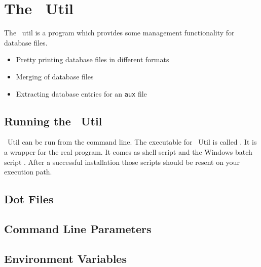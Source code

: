 

\section{The \ExBib\ Util}

The \ExBib\ util is a program which provides some management
functionality for database files. 

\begin{itemize}
\item Pretty printing database files in different formats
\item Merging of database files
\item Extracting database entries for an \texttt{aux} file
\end{itemize}


\subsection{Running the \ExBib\ Util}

\ExBib\ Util can be run from the command line.  The executable for
\ExBib\ Util is called . It is a wrapper for the real
program. It comes as shell script  and the Windows
batch script . After a successful installation
those scripts should be resent on your execution path.


\subsection{Dot Files}%

\INCOMPLETE


\subsection{Command Line Parameters}


\INCOMPLETE


\subsection{Environment Variables}


\INCOMPLETE



\endinput
%
